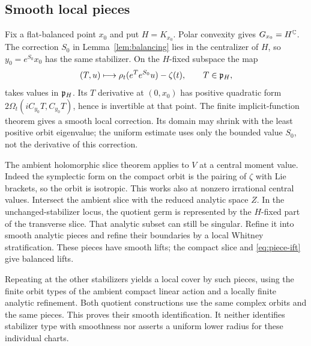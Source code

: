 \subsection{Smooth local pieces}\label{subsec:pieces}
Fix a flat-balanced point $x_0$ and put $H=K_{x_0}$.
Polar convexity gives $G_{x_0}=H^{\mathbb C}$.
The correction $S_0$ in Lemma~\ref{lem:balancing} lies in the
centralizer of $H$, so $y_0=e^{S_0}x_0$ has the same stabilizer.
On the $H$-fixed subspace the map
\begin{equation}\label{eq:piece-ift}
 (T,u)\longmapsto\rho_t(e^Te^{S_0}u)-\zeta(t),
                       \qquad T\in\mathfrak p_H,
\end{equation}
takes values in $\mathfrak p_H$. Its $T$ derivative at $(0,x_0)$ has positive
quadratic form
$2\Omega_t(iC_{y_0}T,C_{y_0}T)$, hence is invertible at that point.
The finite implicit-function theorem gives a smooth local correction.
Its domain may shrink with the least positive orbit eigenvalue;
the uniform estimate uses only the bounded value $S_0$, not the
derivative of this correction.

The ambient holomorphic slice theorem
\cite[Proposition~1.6 and Theorems~1.12, 1.20]{sjamaar}
applies to $V$ at a central moment value. Indeed the symplectic form
on the compact orbit is the pairing of $\zeta$ with Lie brackets,
so the orbit is isotropic. This works also at nonzero irrational
central values. Intersect the ambient slice with the reduced
analytic space $Z$. In the unchanged-stabilizer locus, the quotient
germ is represented by the $H$-fixed part of the transverse slice.
That analytic subset can still be singular. Refine it into smooth
analytic pieces and refine their boundaries by a local Whitney
stratification. These pieces have smooth lifts; the compact slice
and \eqref{eq:piece-ift} give balanced lifts.

Repeating at the other stabilizers yields a local cover by such
pieces, using the finite orbit types of the ambient compact linear
action and a locally finite analytic refinement.
Both quotient constructions use the same complex orbits and the
same pieces. This proves their smooth identification. It neither
identifies stabilizer type with smoothness nor asserts a uniform
lower radius for these individual charts.

